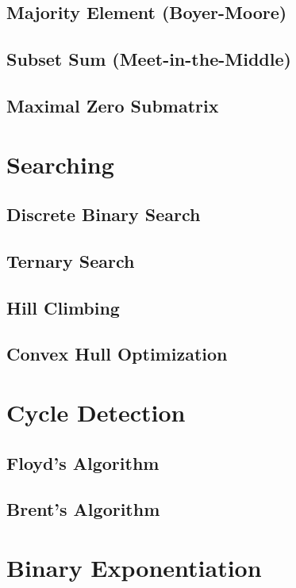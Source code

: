 \subsection{Majority Element (Boyer-Moore)}

\subsection{Subset Sum (Meet-in-the-Middle)}

\subsection{Maximal Zero Submatrix}


\section{Searching}
\setcounter{section}{3}
\setcounter{subsection}{0}
\subsection{Discrete Binary Search}

\subsection{Ternary Search}

\subsection{Hill Climbing}

\subsection{Convex Hull Optimization}


\section{Cycle Detection}
\setcounter{section}{4}
\setcounter{subsection}{0}
\subsection{Floyd's Algorithm}

\subsection{Brent's Algorithm}


\section{Binary Exponentiation}
\setcounter{section}{5}

